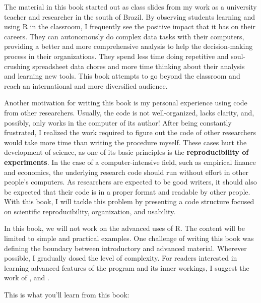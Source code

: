 \documentclass[
  12pt,
]{book}
\begin{document}
The material in this book started out as class slides from my work as a university teacher and researcher in the south of Brazil. By observing students learning and using R in the classroom, I frequently see the positive impact that it has on their careers. They can autonomously do complex data tasks with their computers, providing a better and more comprehensive analysis to help the decision-making process in their organizations. They spend less time doing repetitive and soul-crushing spreadsheet data chores and more time thinking about their analysis and learning new tools. This book attempts to go beyond the classroom and reach an international and more diversified audience.

Another motivation for writing this book is my personal experience using code from other researchers. Usually, the code is not well-organized, lacks clarity, and, possibly, only works in the computer of its author! After being constantly frustrated, I realized the work required to figure out the code of other researchers would take more time than writing the procedure myself. These cases hurt the development of science, as one of its basic principles is the \textbf{reproducibility of experiments}. In the case of a computer-intensive field, such as empirical finance and economics, the underlying research code should run without effort in other people's computers. As researchers are expected to be good writers, it should also be expected that their code is in a proper format and readable by other people. With this book, I will tackle this problem by presenting a code structure focused on scientific reproducibility, organization, and usability.

In this book, we will not work on the advanced uses of R. The content will be limited to simple and practical examples. One challenge of writing this book was defining the boundary between introductory and advanced material. Wherever possible, I gradually dosed the level of complexity. For readers interested in learning advanced features of the program and its inner workings, I suggest the work of \citet{venables2004introduction}, \citet{teetor2011r} and \citet{wickham2019advanced}.

This is what you'll learn from this book:
\end{document}
